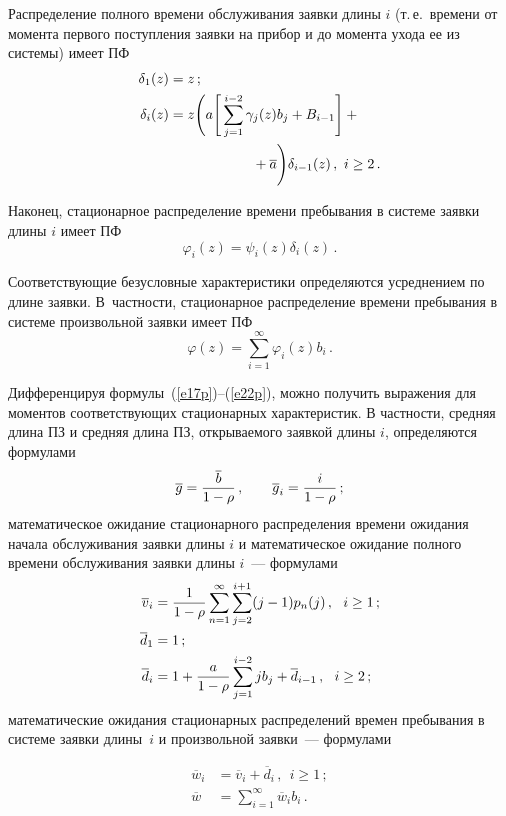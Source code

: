 \begin{multicols}{2}
Распределение полного времени обслуживания заявки длины
$i$ (т.\,е.\ времени от момента первого поступления заявки
на прибор и до момента ухода ее из системы) имеет ПФ
\begin{align}
\delta_1(z) &= z\,;\notag\\
\delta_i(z) &  =z \Bigg(
a \Bigg[
\sum_{j=1}^{i-2} \gamma_{j}(z) b_j + B_{i-1}
\Bigg ] +{} \label{e20p}\\
&\hspace*{60pt}{}+ \overline a
\Bigg)
\delta_{i-1}(z)\,,
\ i\ge 2\,.\notag
\end{align}

Наконец, стационарное распределение времени пребывания в
системе заявки длины $i$ имеет ПФ
\begin{equation}
\varphi_i(z)    = \psi_i(z) \delta_i(z)\,.
\label{e21p}
\end{equation}

Соответствующие безусловные характеристики определяются
усреднением по длине заявки.
В~частности, стационарное распределение времени пребывания
в системе произвольной заявки имеет ПФ
\begin{equation}
\varphi(z)      = \sum_{i=1}^\infty
\varphi_i(z) b_i\,.
\label{e22p}
\end{equation}

Дифференцируя формулы~(\ref{e17p})--(\ref{e22p}), можно получить выражения
для моментов соответствующих стационарных характеристик.
В частности, средняя длина ПЗ и средняя длина ПЗ, открываемого
заявкой длины $i$, определяются формулами
$$
\overline g = \displaystyle\frac{\displaystyle \overline b \mathstrut}{\displaystyle  1-\rho\mathstrut}\,,
\qquad \overline g_i = \displaystyle\frac{\displaystyle i \mathstrut}{\displaystyle  1-\rho\mathstrut}\,;
$$
математическое ожидание стационарного распределения времени
ожидания начала обслуживания заявки длины $i$ и математическое
ожидание полного времени обслуживания заявки длины $i$~---
формулами
\begin{align*}
\overline v_i & = \displaystyle\frac{\displaystyle 1\mathstrut}{\displaystyle 1-\rho\mathstrut}
\sum_{n=1}^\infty \sum_{j=2}^{i+1} (j-1) p_n(j)\,,
\ \ i\ge 1\,;\\
\overline d_1 & = 1\,;\\
\overline d_i & = 1 +  \displaystyle\frac{\displaystyle a\mathstrut}{\displaystyle 1-\rho\mathstrut}
\sum_{j=1}^{i-2} j b_j + \overline d_{i-1}\,,
\ \ i\ge 2\,;
\end{align*}
математические ожидания стационарных распределений времен
пребывания в системе заявки длины~$i$ и произвольной заявки~---
формулами

\noindent
\begin{align*}
\overline w_i & = \overline v_i + \overline d_i\,,
\ \ i\ge 1\,;\\
\overline w & = \sum_{i=1}^\infty \overline w_i b_i\,.
\end{align*}


\end{multicols}
